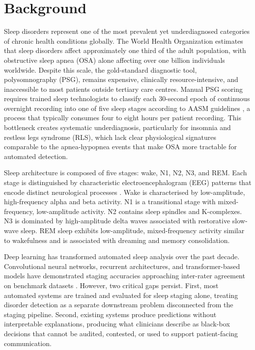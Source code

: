 
\section{Background}

Sleep disorders represent one of the most prevalent yet underdiagnosed categories of chronic health conditions globally. The World Health Organization estimates that sleep disorders affect approximately one third of the adult population, with obstructive sleep apnea (OSA) alone affecting over one billion individuals worldwide. Despite this scale, the gold-standard diagnostic tool, polysomnography (PSG), remains expensive, clinically resource-intensive, and inaccessible to most patients outside tertiary care centres. Manual PSG scoring requires trained sleep technologists to classify each 30-second epoch of continuous overnight recording into one of five sleep stages according to AASM guidelines \cite{berry2020aasm}, a process that typically consumes four to eight hours per patient recording. This bottleneck creates systematic underdiagnosis, particularly for insomnia and restless legs syndrome (RLS), which lack clear physiological signatures comparable to the apnea-hypopnea events that make OSA more tractable for automated detection.

Sleep architecture is composed of five stages: wake, N1, N2, N3, and REM. Each stage is distinguished by characteristic electroencephalogram (EEG) patterns that encode distinct neurological processes \cite{supratak2017deepsleepnet, phan2022sleeptransformer}. Wake is characterised by low-amplitude, high-frequency alpha and beta activity. N1 is a transitional stage with mixed-frequency, low-amplitude activity. N2 contains sleep spindles and K-complexes. N3 is dominated by high-amplitude delta waves associated with restorative slow-wave sleep. REM sleep exhibits low-amplitude, mixed-frequency activity similar to wakefulness and is associated with dreaming and memory consolidation.

Deep learning has transformed automated sleep analysis over the past decade. Convolutional neural networks, recurrent architectures, and transformer-based models have demonstrated staging accuracies approaching inter-rater agreement on benchmark datasets \cite{phan2022sleeptransformer, fu2023tsanet, cong2025bits}. However, two critical gaps persist. First, most automated systems are trained and evaluated for sleep staging alone, treating disorder detection as a separate downstream problem disconnected from the staging pipeline. Second, existing systems produce predictions without interpretable explanations, producing what clinicians describe as black-box decisions that cannot be audited, contested, or used to support patient-facing communication.

